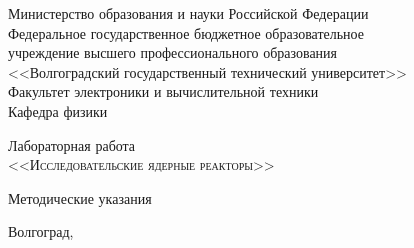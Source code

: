




\renewcommand{\thesection}{\arabic{section}.}
\renewcommand{\thesubsection}{\thesection\arabic{subsection}.}


\newcommand{\el}[3]{\nucleus{#2}{#3}{#1}}

\renewcommand{\maketitlepage}{
    \begin{titlepage}
        \singlespacing
        \newpage
        \begin{center}
            Министерство образования и науки Российской Федерации \\
            Федеральное государственное бюджетное образовательное \\
            учреждение высшего профессионального образования \\
            <<Волгоградский государственный технический университет>> \\
            Факультет электроники и вычислительной техники\\
            Кафедра физики
        \end{center}
        \vspace{9em}
        \begin{center}
            Лабораторная работа\\[.5em]
            \Large\scshape <<Исследовательские ядерные реакторы>>
        \end{center}
        \vspace{1em}        
        \begin{center}
            Методические указания
        \end{center}
        \vspace{3em}
        
        \vspace{\fill}
        \begin{center}
            Волгоград, \the\year
        \end{center}

    \end{titlepage}
    \setcounter{page}{2}
}


    \maketitlepage
    

